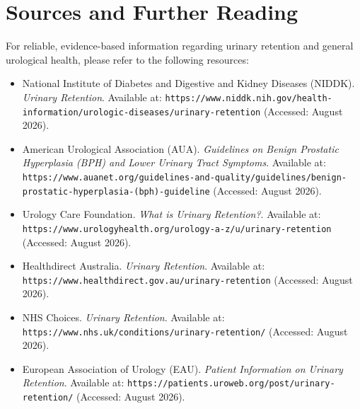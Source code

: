 \section*{Sources and Further Reading}
For reliable, evidence-based information regarding urinary retention and general urological health, please refer to the following resources:
\begin{itemize}
    \item National Institute of Diabetes and Digestive and Kidney Diseases (NIDDK). \textit{Urinary Retention}. Available at: \texttt{https://www.niddk.nih.gov/health-information/urologic-diseases/urinary-retention} (Accessed: August 2026).
    \item American Urological Association (AUA). \textit{Guidelines on Benign Prostatic Hyperplasia (BPH) and Lower Urinary Tract Symptoms}. Available at: \texttt{https://www.auanet.org/guidelines-and-quality/guidelines/benign-prostatic-hyperplasia-(bph)-guideline} (Accessed: August 2026).
    \item Urology Care Foundation. \textit{What is Urinary Retention?}. Available at: \texttt{https://www.urologyhealth.org/urology-a-z/u/urinary-retention} (Accessed: August 2026).
    \item Healthdirect Australia. \textit{Urinary Retention}. Available at: \texttt{https://www.healthdirect.gov.au/urinary-retention} (Accessed: August 2026).
    \item NHS Choices. \textit{Urinary Retention}. Available at: \texttt{https://www.nhs.uk/conditions/urinary-retention/} (Accessed: August 2026).
    \item European Association of Urology (EAU). \textit{Patient Information on Urinary Retention}. Available at: \texttt{https://patients.uroweb.org/post/urinary-retention/} (Accessed: August 2026).
\end{itemize}